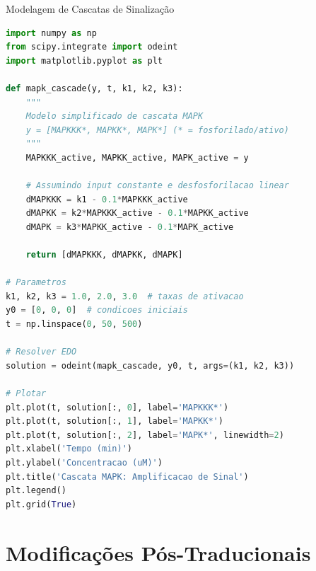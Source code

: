 \begin{frame}[fragile, shrink=15]{Modelagem de Cascatas de Sinalização}
\begin{lstlisting}[language=Python, caption=Cascata MAPK simplificada, basicstyle=\ttfamily\tiny]
import numpy as np
from scipy.integrate import odeint
import matplotlib.pyplot as plt

def mapk_cascade(y, t, k1, k2, k3):
    """
    Modelo simplificado de cascata MAPK
    y = [MAPKKK*, MAPKK*, MAPK*] (* = fosforilado/ativo)
    """
    MAPKKK_active, MAPKK_active, MAPK_active = y

    # Assumindo input constante e desfosforilacao linear
    dMAPKKK = k1 - 0.1*MAPKKK_active
    dMAPKK = k2*MAPKKK_active - 0.1*MAPKK_active
    dMAPK = k3*MAPKK_active - 0.1*MAPK_active

    return [dMAPKKK, dMAPKK, dMAPK]

# Parametros
k1, k2, k3 = 1.0, 2.0, 3.0  # taxas de ativacao
y0 = [0, 0, 0]  # condicoes iniciais
t = np.linspace(0, 50, 500)

# Resolver EDO
solution = odeint(mapk_cascade, y0, t, args=(k1, k2, k3))

# Plotar
plt.plot(t, solution[:, 0], label='MAPKKK*')
plt.plot(t, solution[:, 1], label='MAPKK*')
plt.plot(t, solution[:, 2], label='MAPK*', linewidth=2)
plt.xlabel('Tempo (min)')
plt.ylabel('Concentracao (uM)')
plt.title('Cascata MAPK: Amplificacao de Sinal')
plt.legend()
plt.grid(True)
\end{lstlisting}
\end{frame}

\section{Modificações Pós-Traducionais}

